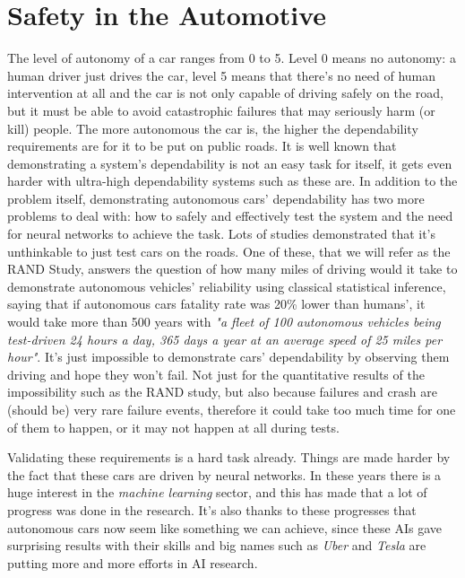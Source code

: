 \section{Safety in the Automotive}

The level of autonomy of a car ranges from 0 to 5. Level 0 means no autonomy: a human driver just drives the car, level 5 means that there's no need of human intervention at all and the car is not only capable of driving safely on the road, but it must be able to avoid catastrophic failures that may seriously harm (or kill) people.
The more autonomous the car is, the higher the dependability requirements are for it to be put on public roads.
It is well known that demonstrating a system's dependability is not an easy task for itself, it gets even harder with ultra-high dependability systems such as these are. In addition to the problem itself, demonstrating autonomous cars' dependability has two more problems to deal with: how to safely and effectively test the system and the need for neural networks to achieve the task.\newline 
Lots of studies demonstrated that it's unthinkable to just test cars on the roads. One of these, that we will refer as the RAND Study, answers the question of how many miles of driving would it take to demonstrate autonomous vehicles' reliability using classical statistical inference, saying that if autonomous cars fatality rate was 20\% lower than humans', it would take more than 500 years with \textsl{"a fleet of 100 autonomous vehicles being test-driven 24 hours a day, 365 days a year at an average speed of 25 miles per hour"}. It's just impossible to demonstrate cars' dependability by observing them driving and hope they won't fail. Not just for the quantitative results of the impossibility such as the RAND study, but also because failures and crash are (should be) very rare failure events, therefore it could take too much time for one of them to happen, or it may not happen at all during tests.\newline\newline

Validating these requirements is a hard task already. Things are made harder by the fact that these cars are driven by neural networks.\newline
In these years there is a huge interest in the \textsl{machine learning} sector, and this has made that a lot of progress was done in the research. It's also thanks to these progresses that autonomous cars now seem like something we can achieve, since these AIs gave surprising results with their skills and big names such as \textsl{Uber} and \textsl{Tesla} are putting more and more efforts in AI research.

